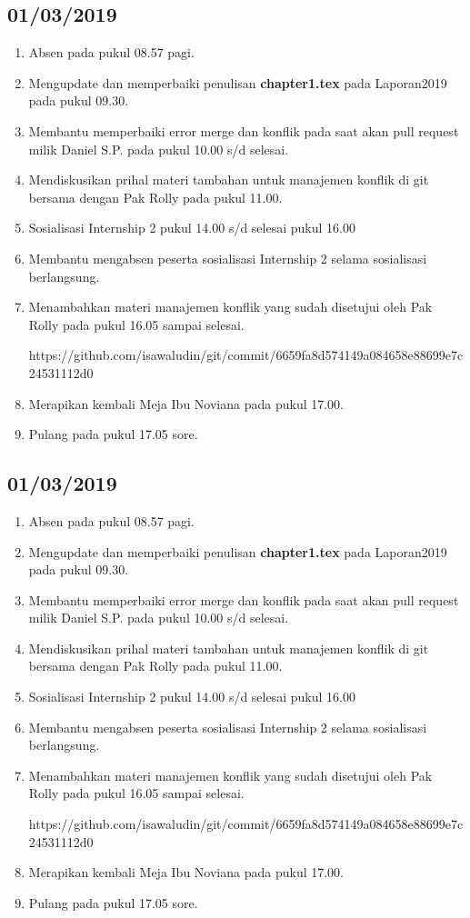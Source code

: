 \subsection{01/03/2019}
\begin{enumerate}
  \item Absen pada pukul 08.57 pagi.
  \item Mengupdate dan memperbaiki penulisan \textbf{chapter1.tex} pada Laporan2019 pada pukul 09.30.
  \item Membantu memperbaiki error merge dan konflik pada saat akan pull request milik Daniel S.P. pada pukul 10.00 s/d selesai.
  \item Mendiskusikan prihal materi tambahan untuk manajemen konflik di git bersama dengan Pak Rolly pada pukul 11.00.
  \item Sosialisasi Internship 2 pukul  14.00 s/d selesai pukul 16.00
  \item Membantu mengabsen peserta sosialisasi Internship 2 selama sosialisasi berlangsung.
  \item Menambahkan materi manajemen konflik yang sudah disetujui oleh Pak Rolly pada pukul 16.05 sampai selesai.
  \par https://github.com/isawaludin/git/commit/6659fa8d574149a084658e88699e7c24531112d0
  \item Merapikan kembali Meja Ibu Noviana pada pukul 17.00.
  \item Pulang pada pukul 17.05 sore.

\end{enumerate}

\subsection{01/03/2019}
\begin{enumerate}
  \item Absen pada pukul 08.57 pagi.
  \item Mengupdate dan memperbaiki penulisan \textbf{chapter1.tex} pada Laporan2019 pada pukul 09.30.
  \item Membantu memperbaiki error merge dan konflik pada saat akan pull request milik Daniel S.P. pada pukul 10.00 s/d selesai.
  \item Mendiskusikan prihal materi tambahan untuk manajemen konflik di git bersama dengan Pak Rolly pada pukul 11.00.
  \item Sosialisasi Internship 2 pukul  14.00 s/d selesai pukul 16.00
  \item Membantu mengabsen peserta sosialisasi Internship 2 selama sosialisasi berlangsung.
  \item Menambahkan materi manajemen konflik yang sudah disetujui oleh Pak Rolly pada pukul 16.05 sampai selesai.
  \par https://github.com/isawaludin/git/commit/6659fa8d574149a084658e88699e7c24531112d0
  \item Merapikan kembali Meja Ibu Noviana pada pukul 17.00.
  \item Pulang pada pukul 17.05 sore.
\end{enumerate}


